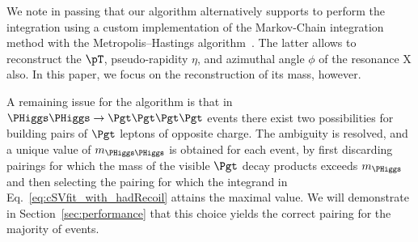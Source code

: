 We note in passing that our algorithm alternatively supports to perform the integration using a custom implementation
of the Markov-Chain integration method with the Metropolis--Hastings algorithm~\cite{Metropolis_Hastings}.
The latter allows to reconstruct the $\pT$, pseudo-rapidity $\eta$, and azimuthal angle $\phi$ of the resonance $\textrm{X}$ also.
In this paper, we focus on the reconstruction of its mass, however.

A remaining issue for the algorithm is that in $\PHiggs\PHiggs \to \Pgt\Pgt\Pgt\Pgt$ events 
there exist two possibilities for building pairs of $\Pgt$ leptons of opposite charge.
The ambiguity is resolved, and a unique value of $m_{\PHiggs\PHiggs}$ is obtained for each event, 
by first discarding pairings for which the mass of the visible $\Pgt$ decay products exceeds $m_{\PHiggs}$
and then selecting the pairing for which the integrand in Eq.~\ref{eq:cSVfit_with_hadRecoil} attains the maximal value.
We will demonstrate in Section~\ref{sec:performance} that this choice yields the correct pairing for the majority of events.





